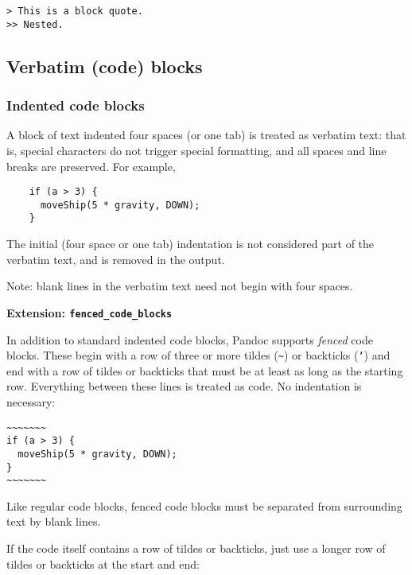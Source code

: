 \documentclass[]{article}
\begin{document}
\begin{verbatim}
> This is a block quote.
>> Nested.
\end{verbatim}

\subsection{Verbatim (code) blocks}\label{verbatim-code-blocks}

\subsubsection{Indented code blocks}\label{indented-code-blocks}

A block of text indented four spaces (or one tab) is treated as verbatim
text: that is, special characters do not trigger special formatting, and
all spaces and line breaks are preserved. For example,

\begin{verbatim}
    if (a > 3) {
      moveShip(5 * gravity, DOWN);
    }
\end{verbatim}

The initial (four space or one tab) indentation is not considered part
of the verbatim text, and is removed in the output.

Note: blank lines in the verbatim text need not begin with four spaces.


\textbf{Extension: \texttt{fenced\_code\_blocks}}

In addition to standard indented code blocks, Pandoc supports
\emph{fenced} code blocks. These begin with a row of three or more
tildes (\texttt{\textasciitilde{}}) or backticks (\texttt{`}) and end
with a row of tildes or backticks that must be at least as long as the
starting row. Everything between these lines is treated as code. No
indentation is necessary:

\begin{verbatim}
~~~~~~~
if (a > 3) {
  moveShip(5 * gravity, DOWN);
}
~~~~~~~
\end{verbatim}

Like regular code blocks, fenced code blocks must be separated from
surrounding text by blank lines.

If the code itself contains a row of tildes or backticks, just use a
longer row of tildes or backticks at the start and end:
\end{document}
